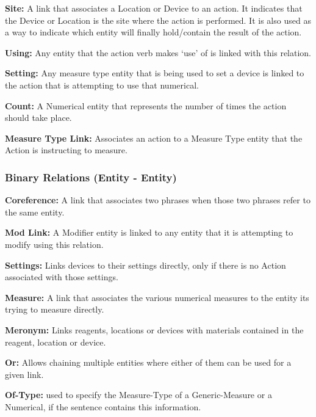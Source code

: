 \documentclass[11pt,a4paper]{article}
\begin{document}
\noindent
\textbf{Site:} A link that associates a Location or Device to an action. It indicates that the Device or Location is the site where the action is performed. It is also used as a way to indicate which entity will finally hold/contain the result of the action.

\noindent
\textbf{Using:} Any entity that the action verb makes ‘use’ of is linked with this relation. 

\noindent
\textbf{Setting:} Any measure type entity that is being used to set a device is linked to the action that is attempting to use that numerical. 

\noindent
\textbf{Count:} A Numerical entity that represents the number of times the action should take place.

\noindent
\textbf{Measure Type Link:} Associates an action to a Measure Type entity that the Action is instructing to measure.

\subsubsection{Binary Relations (Entity - Entity)}

\noindent
\textbf{Coreference:} A link that associates two phrases when those two phrases refer to the same entity. 

\noindent
\textbf{Mod Link:} A Modifier entity is linked to any entity that it is attempting to modify using this relation.

\noindent
\textbf{Settings:} Links devices to their settings directly, only if there is no Action associated with those settings.

\noindent
\textbf{Measure:} A link that associates the various numerical measures to the entity its trying to measure directly.

\noindent
\textbf{Meronym:} Links reagents, locations or devices with materials contained in the reagent, location or device. 

\noindent
\textbf{Or:} Allows chaining multiple entities where either of them can be used for a given link. 

\noindent
\textbf{Of-Type:} used to specify the Measure-Type of a Generic-Measure or a Numerical, if the sentence contains this information.
\end{document}
